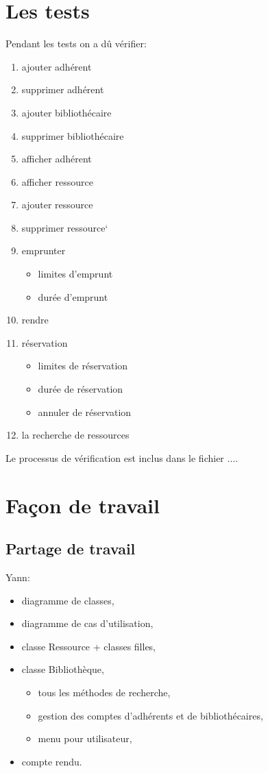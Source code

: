 \documentclass[10pt, a4paper]{article}
\begin{document}
	\section{Les tests}
	Pendant les tests on a dû vérifier:
	\begin{enumerate}
		\item ajouter adhérent
		\item supprimer adhérent
		\item ajouter bibliothécaire
		\item supprimer bibliothécaire
		\item afficher adhérent
		\item afficher ressource
		\item ajouter ressource
		\item supprimer ressource`
		\item emprunter
		\begin{itemize}
			\item limites d'emprunt
			\item durée d'emprunt
		\end{itemize}
		\item rendre
		\item réservation
		\begin{itemize}
			\item limites de réservation
			\item durée de réservation
			\item annuler de réservation
		\end{itemize}
		\item la recherche de ressources 
	\end{enumerate}
	
	
	Le processus de vérification est inclus dans le fichier ....
	
	\section{Façon de travail}
		\subsection{Partage de travail}
		Yann:
		\begin{itemize}
			\item diagramme de classes,
			\item diagramme de cas d'utilisation,
			\item classe Ressource + classes filles,
			\item classe Bibliothèque,
			\begin{itemize}
				\item tous les méthodes de recherche,
				\item gestion des comptes d'adhérents et de bibliothécaires,
				\item menu pour utilisateur,
			\end{itemize}
			\item compte rendu.
			
		\end{itemize}
		
\end{document}
